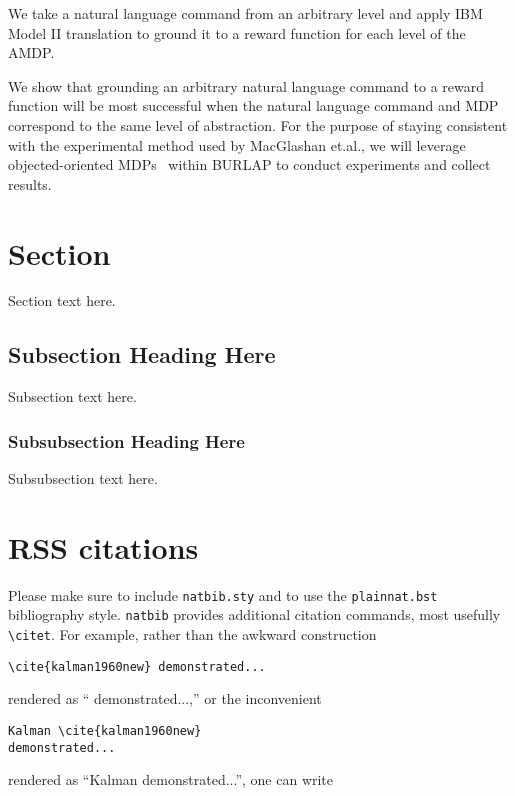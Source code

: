 \documentclass[conference]{IEEEtran}
\begin{document}
We take a natural language command from an arbitrary level and apply IBM Model II translation to ground it to a reward function for each level of the AMDP.

We show that grounding an arbitrary natural language command to a reward function will be most successful when the natural language command and MDP correspond to the same level of abstraction. For the purpose of staying consistent with the experimental method used by MacGlashan et.al., we will leverage objected-oriented MDPs~\cite{Diuk2008AnOR} within BURLAP to conduct experiments and collect results.

\section{Section}

Section text here.

\subsection{Subsection Heading Here}
Subsection text here.

\subsubsection{Subsubsection Heading Here}
Subsubsection text here.


\section{RSS citations}

Please make sure to include \verb!natbib.sty! and to use the
\verb!plainnat.bst! bibliography style. \verb!natbib! provides additional
citation commands, most usefully \verb!\citet!. For example, rather than the
awkward construction

{\small
\begin{verbatim}
\cite{kalman1960new} demonstrated...
\end{verbatim}
}

\noindent
rendered as ``\cite{kalman1960new} demonstrated...,''
or the
inconvenient

{\small
\begin{verbatim}
Kalman \cite{kalman1960new}
demonstrated...
\end{verbatim}
}

\noindent
rendered as
``Kalman \cite{kalman1960new} demonstrated...'',
one can
write
\end{document}

